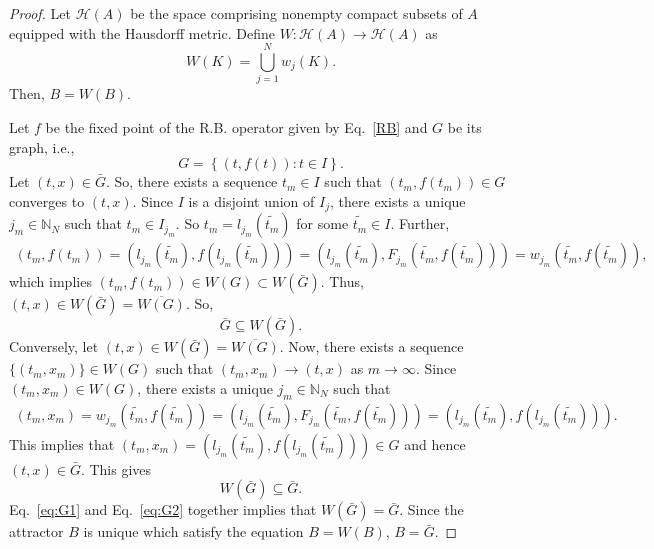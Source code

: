 \documentclass[10pt,a4paper]{amsart}
\begin{document}
\begin{proof}
Let $\mathcal{H}(A)$ be the space comprising nonempty compact subsets of $A$ equipped with the Hausdorff metric.
Define $W:\mathcal{H}(A)\rightarrow\mathcal{H}(A)$ as
\begin{equation*}
W(K)=\bigcup\limits_{j=1}^N w_j(K).
\end{equation*}
Then, $B=W(B)$. 

Let $f$ be the fixed point of the R.B. operator given by Eq.~\eqref{RB} and $G$ be its graph, i.e.,
\begin{equation*}
G=\left\{(t,f(t)):t\in I\right\}.
\end{equation*}
Let $(t,x)\in \bar{G}$. So, there exists a sequence $t_m\in I$ such that $(t_m,f(t_m))\in G$ converges to $(t,x)$. Since $I$ is a disjoint union of $I_j$, there exists a unique $j_m\in\mathbb N_N$ such that $t_m\in I_{j_m}$. So $t_m=l_{j_m}(\tilde{t_m})$ for some $\tilde{t_m}\in I$. Further,
\begin{eqnarray*}
(t_m,f(t_m))=(l_{j_m}(\tilde{t_m}),f(l_{j_m}(\tilde{t_m})))
=(l_{j_m}(\tilde{t_m}),F_{j_m}(\tilde{t_m},f(\tilde{t_m})))=w_{j_m}(\tilde{t_m},f(\tilde{t_m})),
\end{eqnarray*}
 which implies $(t_m,f(t_m))\in W(G)\subset W(\bar{G})$. Thus, $(t,x)\in W(\bar{G})=\overline{W(
G )}$. So, 
\begin{equation}
\bar{G}\subseteq W(\bar{G}).   \label{eq:G1}   
\end{equation}
Conversely, let $(t,x) \in W(\bar{G})=\overline{W(G)}$. Now, there exists a sequence $\{(t_m,x_m)\} \in W(G)$ such that $(t_m,x_m) \rightarrow (t,x)$ as $m \rightarrow \infty$. Since $(t_m,x_m) \in W(G)$, there exists a unique $j_m\in\mathbb N_N$ such that 
\begin{eqnarray*}
(t_m, x_m) = w_{j_m}(\tilde{t_m}, f(\tilde{t_m})) = (l_{j_m}(\tilde{t_m}),F_{j_m}(\tilde{t_m},f(\tilde{t_m}))) = (l_{j_m}(\tilde{t_m}),f(l_{j_m}(\tilde{t_m}))).  
\end{eqnarray*} 
This implies that $(t_m,x_m) = (l_{j_m}(\tilde{t_m}),f(l_{j_m}(\tilde{t_m}))) \in G$ and hence $(t,x) \in \bar{G}$. This gives
\begin{equation}
W(\bar{G})\subseteq \bar{G}. \label{eq:G2}   
\end{equation}
Eq.~\eqref{eq:G1} and Eq.~\eqref{eq:G2} together implies that $W(\bar{G})=\bar{G}$. Since the attractor $B$ is unique which satisfy the equation  $B=W(B)$, $B=\bar{G}$. 
\end{proof}	
\end{document}
